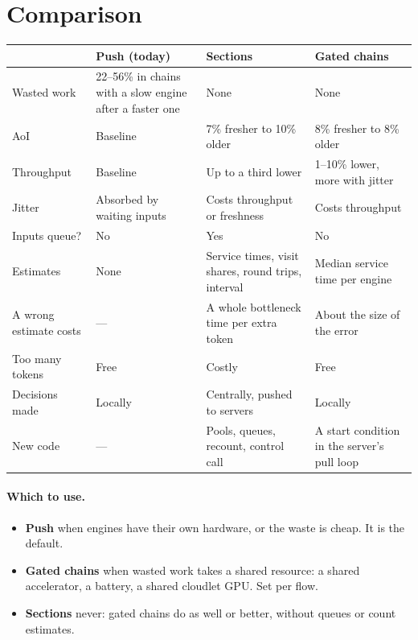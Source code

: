 \documentclass[11pt]{article}
\begin{document}
\section{Comparison}

\begin{center}
\small
\begin{tabular}{@{}p{3.2cm}p{3.5cm}p{3.5cm}p{3.5cm}@{}}
\toprule
 & Push (today) & Sections & Gated chains \\
\midrule
Wasted work & 22--56\% in chains with a slow engine after a faster one &
  None & None \\
AoI & Baseline & 7\% fresher to 10\% older & 8\% fresher to 8\% older \\
Throughput & Baseline & Up to a third lower & 1--10\% lower, more with
  jitter \\
Jitter & Absorbed by waiting inputs & Costs throughput or freshness &
  Costs throughput \\
Inputs queue? & No & Yes & No \\
Estimates & None & Service times, visit shares, round trips, interval &
  Median service time per engine \\
A wrong estimate costs & --- & A whole bottleneck time per extra token &
  About the size of the error \\
Too many tokens & Free & Costly & Free \\
Decisions made & Locally & Centrally, pushed to servers & Locally \\
New code & --- & Pools, queues, recount, control call &
  A start condition in the server's pull loop \\
\bottomrule
\end{tabular}
\end{center}

\paragraph{Which to use.}
\begin{itemize}[nosep]
  \item \textbf{Push} when engines have their own hardware, or the waste is
        cheap. It is the default.
  \item \textbf{Gated chains} when wasted work takes a shared resource: a
        shared accelerator, a battery, a shared cloudlet GPU. Set per flow.
  \item \textbf{Sections} never: gated chains do as well or better, without
        queues or count estimates.
\end{itemize}
\end{document}
